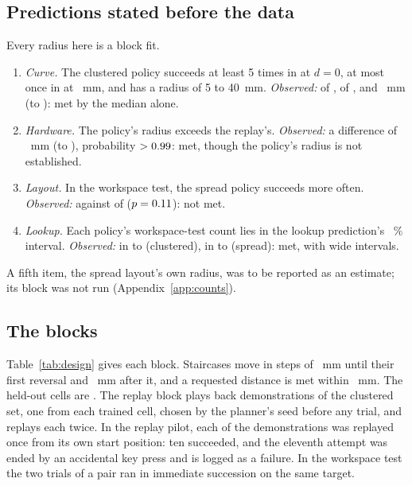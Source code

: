 \subsection{Predictions stated before the data}
Every radius here is a block fit.
\begin{enumerate}
\item \emph{Curve.} The clustered policy succeeds at least 5 times in \anchorsZeroClustered at $d=0$, at most once in \anchorsFarClustered at \farLevel~mm, and has a radius of 5 to 40~mm. %
\emph{Observed:} \successZeroClustered of \nZeroClustered, \successFarClustered of \nFarClustered, and \radiusClusteredThreshold~mm (\radiusClusteredThresholdLow to \radiusClusteredThresholdHigh): met by the median alone.
\item \emph{Hardware.} The policy's radius exceeds the replay's.
\emph{Observed:} a difference of \radiusDiffClusteredReplay~mm (\radiusDiffClusteredReplayLow to \radiusDiffClusteredReplayHigh), probability $>0.99$: met, though the policy's radius is not established.
\item \emph{Layout.} In the workspace test, the spread policy succeeds more often.
\emph{Observed:} \workspaceSuccessSpread against \workspaceSuccessClustered of \nPairs ($p=0.11$): not met.
\item \emph{Lookup.} Each policy's workspace-test count lies in the lookup prediction's \intervalLevel~\% interval.
\emph{Observed:} \workspaceSuccessClustered in \lookupClusteredLow to \lookupClusteredHigh (clustered), \workspaceSuccessSpread in \lookupSpreadLow to \lookupSpreadHigh (spread): met, with wide intervals.
\end{enumerate}
A fifth item, the spread layout's own radius, was to be reported as an estimate; its block was not run (Appendix~\ref{app:counts}).

\subsection{The blocks}
Table~\ref{tab:design} gives each block.
Staircases move in steps of \stepInitial~mm until their first reversal and \stepFinal~mm after it, and a requested distance is met within \levelMatch~mm. The held-out cells are \heldOutCells.
The replay block plays back \nReplayDemosPlanned demonstrations of the clustered set, one from each trained cell, chosen by the planner's seed before any trial, and replays each twice.
In the replay pilot, each of the \nReplayDemosPlanned demonstrations was replayed once from its own start position: ten succeeded, and the eleventh attempt was ended by an accidental key press and is logged as a failure. %
In the workspace test the two trials of a pair ran in immediate succession on the same target.

